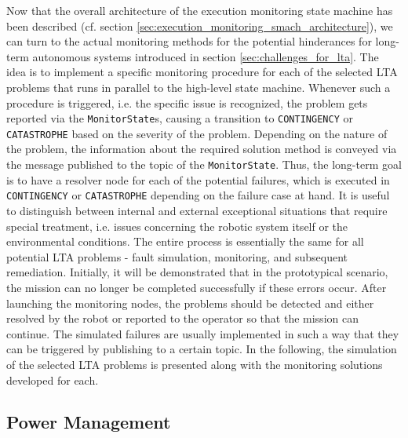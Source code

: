 \documentclass[english, master, utf8]{base/thesis_KBS}
\newcommand{\code}[1]{\colorbox{light-gray}{\texttt{#1}}}
\begin{document}
Now that the overall architecture of the execution monitoring state machine has been described (cf. section \ref{sec:execution_monitoring_smach_architecture}), we can turn to the
actual monitoring methods for the potential hinderances for long-term autonomous systems introduced in section \ref{sec:challenges_for_lta}. The idea is to implement a specific
monitoring procedure for each of the selected LTA problems that runs in parallel to the high-level state machine. Whenever such a procedure is triggered, i.e. the specific issue
is recognized, the problem gets reported via the \code{MonitorState}s, causing a transition to \code{CONTINGENCY} or \code{CATASTROPHE} based on the severity of the problem.
Depending on the nature of the problem, the information about the required solution method is conveyed via the message published to the topic of the \code{MonitorState}.
Thus, the long-term goal is to have a resolver node for each of the potential failures, which is executed in \code{CONTINGENCY} or \code{CATASTROPHE} depending on the
failure case at hand. It is useful to distinguish between internal and external exceptional situations that require special treatment, i.e. issues concerning the robotic
system itself or the environmental conditions. \cite{Hawes:2017}
The entire process is essentially the same for all potential LTA problems - fault simulation, monitoring, and subsequent remediation. 
Initially, it will be demonstrated that in the prototypical scenario, the mission can no longer be completed successfully if these errors occur.
After launching the monitoring nodes, the problems should be detected and either resolved by the robot or reported to the operator so that the mission can continue.
The simulated failures are usually implemented in such a way that they can be triggered by publishing to a certain topic.
In the following, the simulation of the selected LTA problems is presented along with the monitoring solutions developed for each.

\subsection{Power Management}
\label{sec:sim_and_mon_power_management}
\end{document}
